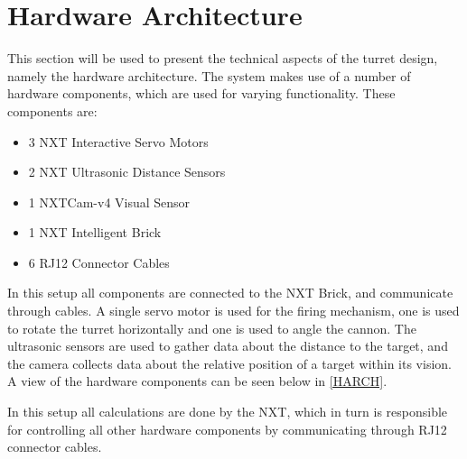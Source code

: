 \section{Hardware Architecture}
This section will be used to present the technical aspects
of the turret design, namely the hardware architecture. The \name system makes
use of a number of hardware components, which are used for varying
functionality. These components are:

\begin{itemize}
  \item 3 NXT Interactive Servo Motors
  \item 2 NXT Ultrasonic Distance Sensors
  \item 1 NXTCam-v4 Visual Sensor
  \item 1 NXT Intelligent Brick
  \item 6 RJ12 Connector Cables
\end{itemize}

In this setup all components are connected to the NXT Brick, and communicate
through cables. A single servo motor is used for the firing mechanism, one
is used to rotate the turret horizontally and one is used to angle the
cannon. The ultrasonic sensors are used to gather data
about the distance to the target, and the camera collects data about the
relative position of a target within its vision. A view of the hardware
components can be seen below in \autoref{HARCH}.


In this setup all calculations are done by the NXT, which in turn is responsible
for controlling all other hardware components by communicating through RJ12
connector cables.